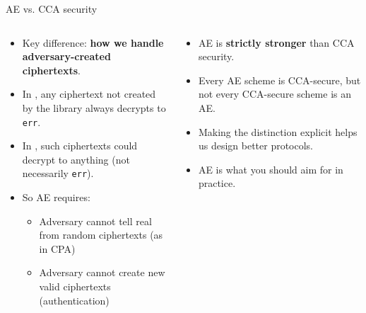 \documentclass[aspectratio=169, lualatex, handout]{beamer}
\begin{document}
\begin{frame}{AE vs. CCA security}
	\begin{columns}[c]
		\begin{column}{0.5\textwidth}
			\begin{itemize}[<+->]
				\item Key difference: \textbf{how we handle adversary-created ciphertexts}.
				\item In , any ciphertext not created by the library always decrypts to \texttt{err}.
				\item In , such ciphertexts could decrypt to anything (not necessarily \texttt{err}).
				\item So AE requires:
				      \begin{itemize}
					      \item Adversary cannot tell real from random ciphertexts (as in CPA)
					      \item Adversary cannot create new valid ciphertexts (authentication)
				      \end{itemize}
			\end{itemize}
		\end{column}
		\begin{column}{0.5\textwidth}
			\begin{itemize}[<+->]
				\item AE is \textbf{strictly stronger} than CCA security.
				\item Every AE scheme is CCA-secure, but not every CCA-secure scheme is an AE.
				\item Making the distinction explicit helps us design better protocols.
				\item AE is what you should aim for in practice.
			\end{itemize}
		\end{column}
	\end{columns}
\end{frame}
\end{document}
